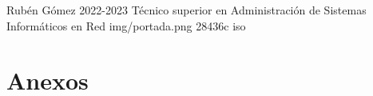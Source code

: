 \documentclass{\ClassPath/yukibook}
\begin{document}
    {Rubén Gómez}  %
    {2022-2023}    %
    {Técnico superior en Administración de \linebreak Sistemas Informáticos en Red} %
    {}%
    {}%
    {img/portada.png} %
    {28436c}
    {iso} %

    \coverpage

    \tableofcontents

    \graphicspath{{../../../temas_comunes/sistemas_de_numeracion/img/}}
    


    \graphicspath{{../../../DAM/1/sistemas_informaticos/img/si}}
    

    


    \graphicspath{{img/iso/}}
    

    \part{Anexos}
    
    
\end{document}
